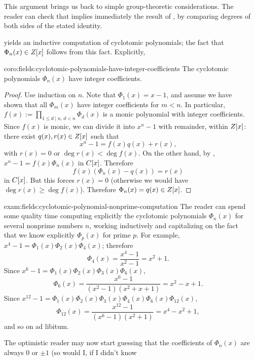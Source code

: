 This argument brings us back to simple group-theoretic
considerations. The reader can check that 
implies immediately the result of
, by comparing degrees of
both sides of the stated identity.

 yields an inductive computation of cyclotomic
polynomials; the fact that $\Phi_n(x) \in Z[x]$ follows from this
fact.  Explicitly,
\begin{coro}{}{coro:fields:cyclotomic-polynomials-have-integer-coefficients}
  The cyclotomic polynomials $\Phi_n(x)$ have integer coefficients.
\end{coro}
\begin{proof}
  Use induction on $n$. Note that $\Phi_1(x) = x - 1$, and assume we
  have shown that all $\Phi_m(x)$ have integer coefficients for
  $m < n$. In particular,
  $f(x) := \prod_{1 \leq d \mid n,\, d < n} \Phi_d(x)$ is a monic
  polynomial with integer coefficients. Since $f(x)$ is monic, we can
  divide it into $x^n - 1$ with remainder, within $Z[x]$: there exist
  $q(x), r(x) \in Z[x]$ such that
  \[
    x^n - 1 = f(x)q(x) + r(x),
  \]
  with $r(x) = 0$ or $\deg r(x) < \deg f(x)$. On the other hand, by
  , $x^n - 1 = f(x)\Phi_n(x)$ in
  $C[x]$. Therefore
  \[
    f(x)(\Phi_n(x) - q(x)) = r(x)
  \]
  in $C[x]$. But this forces $r(x) = 0$ (otherwise we would have
  $\deg r(x) \geq \deg f(x)$). Therefore $\Phi_n(x) = q(x) \in Z[x]$.
\end{proof}
\begin{exam}{}{exam:fields:cyclotomic-polynomial-nonprime-computation}
  The reader can spend some quality time computing explicitly the
  cyclotomic polynomials $\Phi_n(x)$ for several nonprime numbers $n$,
  working inductively and capitalizing on the fact that we know
  explicitly $\Phi_p(x)$ for prime $p$. For example,
  $x^4 - 1 = \Phi_1(x)\Phi_2(x) \Phi_4(x)$; therefore
  \[
    \Phi_4(x) = \frac{x^4 - 1}{x^2 - 1} = x^2 + 1.
  \]
  Since $x^6 - 1 = \Phi_1(x)\Phi_2(x)\Phi_3(x)\Phi_6(x)$,
  \[
    \Phi_6(x) = \frac{x^6 - 1}{(x^2-1)(x^2+x+1)} = x^2 - x + 1.
  \]
  Since
  $x^{12} - 1 = \Phi_1(x)\Phi_2(x)\Phi_3(x)\Phi_4(x)\Phi_6(x)
  \Phi_{12}(x)$,
  \[
    \Phi_{12}(x) = \frac{x^{12}-1}{(x^6-1)(x^2+1)} = x^4 - x^2 + 1,
  \]
  and so on ad libitum.
\end{exam}
The optimistic reader may now start guessing that the coefficients of
$\Phi_n(x)$ are always $0$ or $\pm 1$ (so would I, if I didn't know
